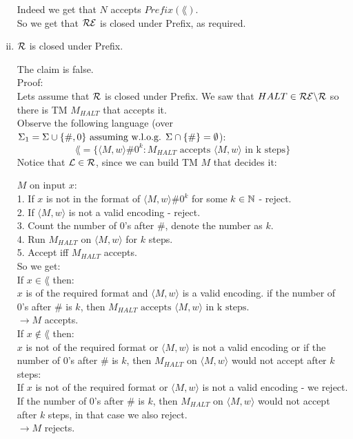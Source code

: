 \begin{enumerate}[i.]
          Indeed we get that $N$ accepts $Prefix(\lang)$. \\
          So we get that $\mathcal{R}\mathcal{E}$ is closed under Prefix, as required. \\

    \item $\mathcal{R}$ is closed under Prefix.

          The claim is false. \\

          Proof: \\
          Lets assume that $\mathcal{R}$ is closed under Prefix. We saw that $HALT \in \mathcal{R}\mathcal{E} \backslash \mathcal{R}$
          so there is TM $M_{HALT}$ that accepts it. \\
          Observe the following language (over $\Sigma_1 = \Sigma \cup \{\#, 0\} \text{ assuming w.l.o.g. } \Sigma \cap \{\#\} = \emptyset$):
          \[
              \lang = \{\langle M, w \rangle \#0^k : M_{HALT} \text{ accepts } \langle M, w \rangle \text{ in k steps}\}
          \]
          Notice that $\mathcal{L} \in \mathcal{R}$, since we can build TM $M$ that decides it:

          $M \text{ on input } x$: \\
          1. If $x$ is not in the format of $\langle M, w \rangle \#0^k$ for some $k \in \mathbb{N}$ - reject. \\
          2. If $\langle M, w \rangle$ is not a valid encoding - reject. \\
          3. Count the number of 0's after \#, denote the number as $k$. \\
          4. Run $M_{HALT}$ on $\langle M, w \rangle$ for $k$ steps. \\
          5. Accept iff $M_{HALT}$ accepts. \\

          So we get: \\
          If $x \in \lang$ then: \\
          $x$ is of the required format and $\langle M, w \rangle$ is a valid encoding. if the number of 0's after \# is $k$, then
          $M_{HALT} \text{ accepts } \langle M, w \rangle \text{ in k steps}$.  \\
          $\rightarrow M$ accepts. \\

          If $x \notin \lang$ then: \\
          $x$ is not of the required format or $\langle M, w \rangle$ is not a valid encoding or
          if the number of 0's after \# is $k$, then $M_{HALT}$ on $\langle M, w \rangle$ would not accept after $k$ steps: \\
          If $x$ is not of the required format or $\langle M, w \rangle$ is not a valid encoding - we reject. \\
          If the number of 0's after \# is $k$, then $M_{HALT}$ on $\langle M, w \rangle$ would not accept after $k$ steps,
          in that case we also reject. \\
          $\rightarrow M$ rejects. \\


\end{enumerate}
